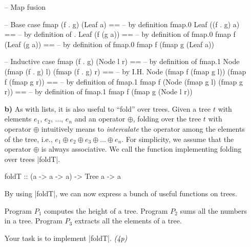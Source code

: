 \documentclass[a4,11pt]{article}
\newif\ifsol
\newcommand{\points}[1]{\hfill \textsl{({#1}p)}}
\begin{document}
\begin{enumerate}
\begin{code}
  -- Map fusion

  -- Base case
      fmap (f . g) (Leaf a)        ==
  --  { by definition fmap.0 }
      Leaf ((f . g) a)             ==
  --  { by definition of . }
      Leaf (f (g a))               ==
  --  { by definition of fmap.0 }
      fmap f (Leaf (g a))          ==
  --  { by definition of fmap.0 }
      fmap f (fmap g (Leaf a))

  -- Inductive case
      fmap (f . g) (Node l r)                       ==
  --  { by definition of fmap.1 }
      Node (fmap (f . g) l)    (fmap (f . g) r)     ==
  --  { by I.H. }
      Node (fmap f (fmap g l)) (fmap f (fmap g r))  ==
  --  { by definition of fmap.1 }
      fmap f (Node (fmap g l) (fmap g r))           ==
  --  { by definition of fmap.1 }
      fmap f (fmap g (Node l r))
  \end{code}
  \fi

\item [\textbf{b)}] As with lists, it is also useful to ``fold'' over
  trees. Given a tree $t$ with elements $e_1$, $e_2$, $\ldots$, $e_n$ and an
  operator $\oplus$, folding over the tree $t$ with operator $\oplus$
  intuitively means to \emph{intercalate} the operator among the elements of the
  tree, i.e., $e_1 \oplus e_2 \oplus e_3 \oplus \ldots \oplus e_n$. For
  simplicity, we assume that the operator $\oplus$ is always associative.
  We call the function implementing folding over trees |foldT|.

  \begin{code}
  foldT :: (a -> a -> a) -> Tree a -> a
  \end{code}

  By using |foldT|, we can now express a bunch of useful functions on trees.


  Program $P_1$ computes the height of a tree. Program $P_2$ sums
  all the numbers in a tree. Program $P_3$ extracts all the elements of a tree.

  Your task is to implement |foldT|. \points{4}

  \ifsol
  \begin{code}
  foldT :: (a -> a -> a) -> Tree a -> a
  foldT  op  (Leaf a)    =  a
  foldT  op  (Node l r)  =  (foldT op l) `op` (foldT op r)
  \end{code}
  \fi


\end{enumerate}
\end{document}
